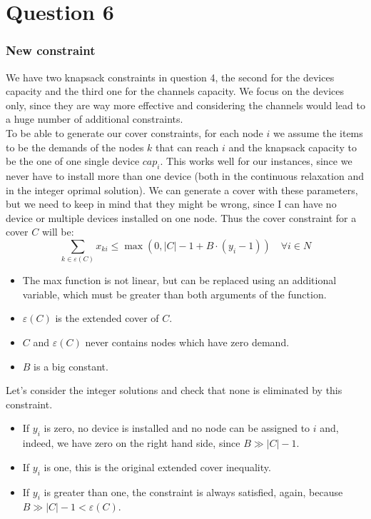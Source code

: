 \section{Question 6}

\subsubsection{New constraint}

We have two knapsack constraints in question 4, the second for the devices capacity and the third one for the channels capacity. We focus on the devices only, since they are way more effective and considering the channels would lead to a huge number of additional constraints.  \\

To be able to generate our cover constraints, for each node $i$ we assume the items to be the demands of the nodes $k$ that can reach $i$ and the knapsack capacity to be the one of one single device $cap_i$. This works well for our instances, since we never have to install more than one device (both in the continuous relaxation and in the integer oprimal solution).
We can generate a cover with these parameters, but we need to keep in mind that they might be wrong, since I can have no device or multiple devices installed on one node. Thus the cover constraint for a cover $C$ will be:
$$
\sum_{k \in \varepsilon(C)} x_{ki} \leq \max(0, |C| - 1 + B \cdot (y_i - 1)) \quad \forall i \in N
$$

\begin{itemize}
	\item The max function is not linear, but can be replaced using an additional variable, which must be greater than both arguments of the function.
	\item $\varepsilon(C)$ is the extended cover of $C$.
	\item $C$ and $\varepsilon(C)$ never contains nodes which have zero demand.
	\item $B$ is a big constant.
\end{itemize}

Let's consider the integer solutions and check that none is eliminated by this constraint.
\begin{itemize}
	\item If $y_i$ is zero, no device is installed and no node can be assigned to $i$ and, indeed, we have zero on the right hand side, since $B \gg |C| - 1$.
	\item If $y_i$ is one, this is the original extended cover inequality.
	\item If $y_i$ is greater than one, the constraint is always satisfied, again, because $B \gg |C| - 1 < \varepsilon(C)$.
\end{itemize}

